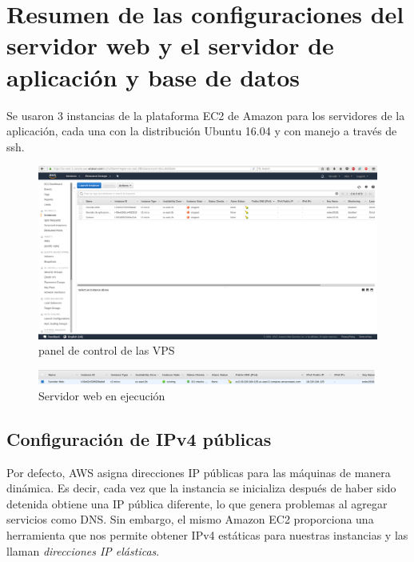 \documentclass[9pt]{article}
\begin{document}
\newpage

\section{Resumen de las configuraciones del servidor web y el servidor de aplicación y base de datos}
Se usaron 3 instancias de la plataforma \textsf{EC2} de Amazon para los servidores de la aplicación, cada una con la distribución \textsf{Ubuntu 16.04} y con manejo a través de \textsf{ssh}. 
\begin{figure}[H]
  \centering
  \includegraphics[width=\textwidth]{instances_dashboard}
  \caption{panel de control de las VPS}
\end{figure}
\begin{figure}[H]
  \centering
  \includegraphics[width=\textwidth]{web_server}
  \caption{Servidor web en ejecución}
\end{figure}

\subsection{Configuración de IPv4 públicas}
Por defecto, \textsf{AWS} asigna direcciones IP públicas para las máquinas de manera dinámica. Es decir, cada vez que la instancia se inicializa después de haber sido detenida obtiene una IP pública diferente, lo que genera problemas al agregar servicios como DNS. Sin embargo, el mismo \textsf{Amazon EC2} proporciona una herramienta que nos permite obtener IPv4 estáticas para nuestras instancias y las llaman \textit{direcciones IP elásticas}.\\
\end{document}
